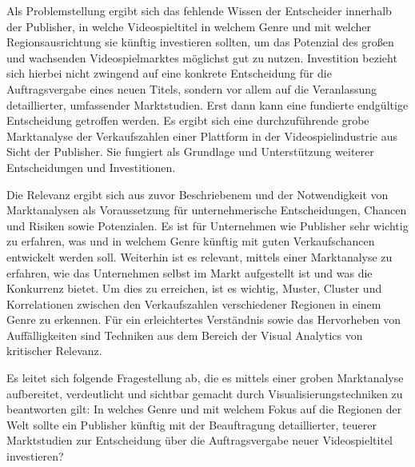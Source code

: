 \documentclass[usegeometry=true]{scrartcl}
\begin{document}
Als Problemstellung ergibt sich das fehlende Wissen der Entscheider innerhalb der Publisher, in welche Videospieltitel in welchem Genre und mit welcher Regionsausrichtung sie künftig investieren sollten, um das Potenzial des großen und wachsenden Videospielmarktes möglichst gut zu nutzen.
Investition bezieht sich hierbei nicht zwingend auf eine konkrete Entscheidung für die Auftragsvergabe eines neuen Titels, sondern vor allem auf die Veranlassung detaillierter, umfassender Marktstudien.
Erst dann kann eine fundierte endgültige Entscheidung getroffen werden.
Es ergibt sich eine durchzuführende grobe Marktanalyse der Verkaufszahlen einer Plattform in der Videospielindustrie aus Sicht der Publisher.
Sie fungiert als Grundlage und Unterstützung weiterer Entscheidungen und Investitionen.

Die Relevanz ergibt sich aus zuvor Beschriebenem und der Notwendigkeit von Marktanalysen als Voraussetzung für unternehmerische Entscheidungen, Chancen und Risiken sowie Potenzialen.\cite{Fleig.2020}
Es ist für Unternehmen wie Publisher sehr wichtig zu erfahren, was und in welchem Genre künftig mit guten Verkaufschancen entwickelt werden soll.
Weiterhin ist es relevant, mittels einer Marktanalyse zu erfahren, wie das Unternehmen selbst im Markt aufgestellt ist und was die Konkurrenz bietet. 
Um dies zu erreichen, ist es wichtig, Muster, Cluster und Korrelationen zwischen den Verkaufszahlen verschiedener Regionen in einem Genre zu erkennen. 
Für ein erleichtertes Verständnis sowie das Hervorheben von Auffälligkeiten sind Techniken aus dem Bereich der Visual Analytics von kritischer Relevanz.

Es leitet sich folgende Fragestellung ab, die es mittels einer groben Marktanalyse aufbereitet, verdeutlicht und sichtbar gemacht durch Visualisierungstechniken zu beantworten gilt:
In welches Genre und mit welchem Fokus auf die Regionen der Welt sollte ein Publisher künftig mit der Beauftragung detaillierter, teuerer Marktstudien zur Entscheidung über die Auftragsvergabe neuer Videospieltitel investieren?
\end{document}
